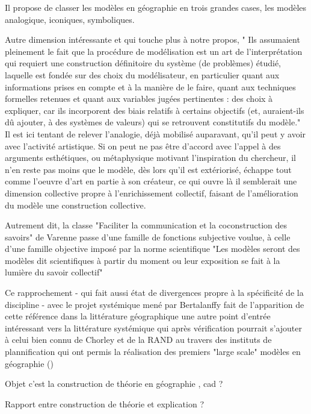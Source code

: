 {Il propose de classer les modèles en géographie en trois grandes cases, les modèles analogique, iconiques, symboliques. 

Autre dimension intéressante et qui touche plus à notre propos, " Ils assumaient pleinement le fait que la procédure de modélisation est un art de l’interprétation qui requiert une construction définitoire du système (de problèmes) étudié, laquelle est fondée sur des choix du modélisateur, en particulier quant aux informations prises en compte et à la manière de le faire, quant aux techniques formelles retenues et quant aux variables jugées pertinentes : des choix à expliquer, car ils incorporent des biais relatifs à certains objectifs (et, auraient-ils dû ajouter, à des systèmes de valeurs) qui se retrouvent constitutifs du modèle." \autocite[806]{Pouvreau2013} Il est ici tentant de relever l'analogie, déjà mobilisé auparavant, qu'il peut y avoir avec l'activité artistique. Si on peut ne pas être d'accord avec l'appel à des arguments esthétiques, ou métaphysique motivant l'inspiration du chercheur, il n'en reste pas moins que le modèle, dès lors qu'il est extériorisé, échappe tout comme l'oeuvre d'art en partie à son créateur, ce qui ouvre là il semblerait une dimension collective propre à l'enrichissement collectif, faisant de l'amélioration du modèle une construction collective. 

Autrement dit, la classe "Faciliter la communication et la coconstruction des savoirs" de Varenne passe d'une famille de fonctions subjective voulue, à celle d'une famille objective imposé par la norme scientifique "Les modèles seront des modèles dit scientifiques à partir du moment ou leur exposition se fait à la lumière du savoir collectif" 

Ce rapprochement - qui fait aussi état de divergences propre à la spécificité de la discipline - avec le projet systémique mené par Bertalanffy \autocite[804-805]{Pouvreau2013} fait de l'apparition de cette référence dans la littérature géographique une autre point d'entrée intéressant vers la littérature systémique qui après vérification pourrait s'ajouter à celui bien connu de Chorley \autocite{Chorley1962} et de la RAND au travers des instituts de plannification qui ont permis la réalisation des premiers "large scale" modèles en géographie (\autocite[6]{Batty1976})



Objet c'est la construction de théorie en géographie , cad ? 


Rapport entre construction de théorie et explication ? 

}
